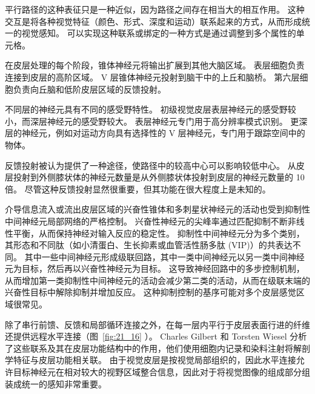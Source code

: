 平行路径的这种表征只是一种近似，因为路径之间存在相当大的相互作用。 
这种交互是将各种视觉特征（颜色、形式、深度和运动）联系起来的方式，从而形成统一的视觉感知。 
可以实现这种联系或绑定的一种方式是通过调整到多个属性的单元格。


在皮层处理的每个阶段，锥体神经元将输出扩展到其他大脑区域。 
表层细胞负责连接到皮层的高阶区域。 
V 层锥体神经元投射到脑干中的上丘和脑桥。 
第六层细胞负责向丘脑和低阶皮层区域的反馈投射。


不同层的神经元具有不同的感受野特性。
初级视觉皮层表层神经元的感受野较小，而深层神经元的感受野较大。
表层神经元专门用于高分辨率模式识别。 
更深层的神经元，例如对运动方向具有选择性的 V 层神经元，专门用于跟踪空间中的物体。


反馈投射被认为提供了一种途径，使路径中的较高中心可以影响较低中心。
从皮层投射到外侧膝状体的神经元数量是从外侧膝状体投射到皮层的神经元数量的 10 倍。
尽管这种反馈投射显然很重要，但其功能在很大程度上是未知的。


介导信息流入或流出皮层区域的兴奋性锥体和多刺星状神经元的活动也受到抑制性中间神经元局部网络的严格控制。
兴奋性神经元的尖峰率通过匹配抑制不断非线性平衡，从而保持神经对输入反应的稳定性。
抑制性中间神经元分为多个类别，其形态和不同肽（如小清蛋白、生长抑素或血管活性肠多肽 (VIP)）的共表达不同。
其中一些中间神经元形成级联回路，其中一类中间神经元以另一类中间神经元为目标，然后再以兴奋性神经元为目标。
这导致神经回路中的多步控制机制，从而增加第一类抑制性中间神经元的活动会减少第二类的活动，从而在级联末端的兴奋性目标中解除抑制并增加反应。
这种抑制控制的基序可能对多个皮层感觉区域很常见。


除了串行前馈、反馈和局部循环连接之外，在每一层内平行于皮层表面行进的纤维还提供远程水平连接（图~\ref{fig:21_16} ）。
Charles Gilbert 和 Torsten Wiesel 分析了这些联系及其在皮层功能结构中的作用，他们使用细胞内记录和染料注射将解剖学特征与皮层功能相关联。
由于视觉皮层是按视觉局部组织的，因此水平连接允许目标神经元在相对较大的视野区域整合信息，因此对于将视觉图像的组成部分组装成统一的感知非常重要。


